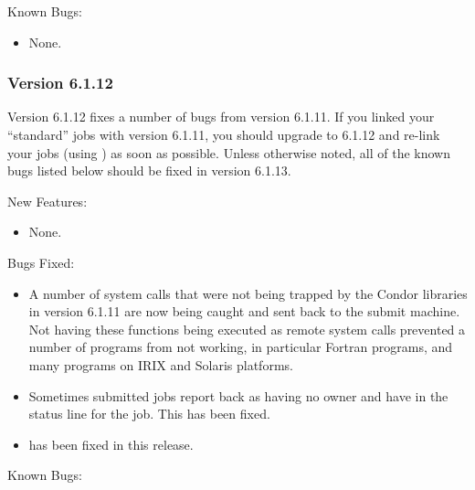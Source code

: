 \noindent Known Bugs:

\begin{itemize}

\item None.

\end{itemize}

\subsubsection{\label{sec:New-6-1-12}Version 6.1.12}

Version 6.1.12 fixes a number of bugs from version 6.1.11.
If you linked your ``standard'' jobs with version 6.1.11, you should
upgrade to 6.1.12 and re-link your jobs (using ) as soon as
possible.
Unless otherwise noted, all of the known bugs listed below should be fixed
in version 6.1.13.  

\noindent New Features:

\begin{itemize}

\item None.

\end{itemize}

\noindent Bugs Fixed:

\begin{itemize}

\item A number of system calls that were not being trapped by the Condor
libraries in version 6.1.11 are now being caught and sent back to the
submit machine.
Not having these functions being executed as remote system calls prevented
a number of programs from not working, in particular Fortran programs, and
many programs on IRIX and Solaris platforms.

\item Sometimes submitted jobs report back as having no owner and have
 in the status line for the job. This has been fixed.

\item {}  has been fixed in this release.

\end{itemize}

\noindent Known Bugs:

